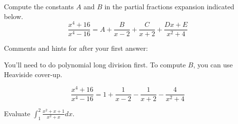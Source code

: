 \documentclass{ximera}
\begin{document}
\begin{question}%

Compute the constants \(A\) and \(B\) in the partial fractions expansion indicated below. 
\[ \frac{x^4 + 16}{x^4 - 16} =A +  \frac{B}{x-2} + \frac{C}{x+2} + \frac{Dx + E}{x^2 + 4} \]
\begin{multiplechoice}
\end{multiplechoice}
Comments and hints for after your first answer:
\begin{feedback}
You'll need to do polynomial long division first. To compute $B$, you can use Heaviside cover-up.
\begin{hint}
\[  \frac{x^4 + 16}{x^4 - 16} = 1 + \frac{1}{x-2} - \frac{1}{x+2} - \frac{4}{x^2+4} \]
\end{hint}
\end{feedback}


\end{question}

\begin{question}%

Evaluate \(\displaystyle \int_1^2 \frac{x^2+x+1}{x^2+x} dx\).
\begin{multiplechoice}
\end{multiplechoice}

\end{question}
\end{document}
